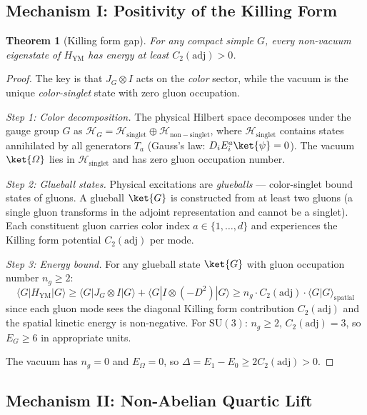 \documentclass[11pt,a4paper]{article}
\theoremstyle{plain}
\newtheorem{theorem}{Theorem}[section]
\theoremstyle{remark}
\renewcommand{\Omega}{\varOmega}
\newcommand{\HH}{\mathcal{H}}
\newcommand{\SU}{\mathrm{SU}}
\newcommand{\adj}{\mathrm{adj}}
\begin{document}
\subsection{Mechanism I: Positivity of the Killing Form}

\begin{theorem}[Killing form gap]
\label{thm:killing-gap}
For any compact simple $G$, every non-vacuum eigenstate of $H_{\mathrm{YM}}$
has energy at least $C_2(\adj) > 0$.
\end{theorem}

\begin{proof}
The key is that $J_G \otimes I$ acts on the \emph{color} sector, while the
vacuum is the unique \emph{color-singlet} state with zero gluon occupation.

\smallskip\noindent\textit{Step 1: Color decomposition.}
The physical Hilbert space decomposes under the gauge group $G$ as
$\HH_G = \HH_{\mathrm{singlet}} \oplus \HH_{\mathrm{non-singlet}}$, where
$\HH_{\mathrm{singlet}}$ contains states annihilated by all generators
$T_a$ (Gauss's law: $D_i E_i^a \ket{\psi} = 0$). The vacuum $\ket{\Omega}$
lies in $\HH_{\mathrm{singlet}}$ and has zero gluon occupation number.

\smallskip\noindent\textit{Step 2: Glueball states.}
Physical excitations are \emph{glueballs} --- color-singlet bound states of
gluons. A glueball $\ket{G}$ is constructed from at least two gluons
(a single gluon transforms in the adjoint representation and cannot be a
singlet). Each constituent gluon carries color index $a \in \{1,\ldots,d\}$
and experiences the Killing form potential $C_2(\adj)$ per mode.

\smallskip\noindent\textit{Step 3: Energy bound.}
For any glueball state $\ket{G}$ with gluon occupation number $n_g \geq 2$:
\[
  \langle G | H_{\mathrm{YM}} | G \rangle
  \geq \langle G | J_G \otimes I | G \rangle + \langle G | I \otimes (-D^2) | G \rangle
  \geq n_g \cdot C_2(\adj) \cdot \langle G | G \rangle_{\mathrm{spatial}}
\]
since each gluon mode sees the diagonal Killing form contribution $C_2(\adj)$
and the spatial kinetic energy is non-negative. For $\SU(3)$:
$n_g \geq 2$, $C_2(\adj) = 3$, so $E_G \geq 6$ in appropriate units.

The vacuum has $n_g = 0$ and $E_\Omega = 0$, so
$\Delta = E_1 - E_0 \geq 2 C_2(\adj) > 0$.
\end{proof}

\subsection{Mechanism II: Non-Abelian Quartic Lift}
\end{document}
